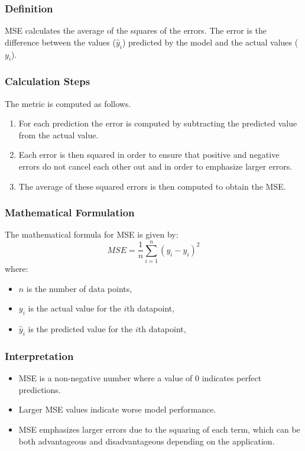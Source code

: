 \subsubsection{Definition}
MSE calculates the average of the squares of the errors. The error is the difference between the values (\(\hat{y}_i\)) predicted by the model and the actual values (\(y_i\)).

\subsubsection{Calculation Steps}
The metric is computed as follows.
\begin{enumerate}
	\item For each prediction the error is computed by subtracting the predicted value from the actual value.
	\item Each error is then squared in order to ensure that positive and negative errors do not cancel each other out and in order to emphasize larger errors.
	\item The average of these squared errors is then computed to obtain the MSE.
\end{enumerate}

\subsubsection{Mathematical Formulation}
The mathematical formula for MSE is given by:
\begin{equation}
	MSE = \frac{1}{n} \sum_{i=1}^{n} (y_i - \hat{y}_i)^2
\end{equation}
where:
\begin{itemize}
	\item \(n\) is the number of data points,
	\item \(y_i\) is the actual value for the \(i\)th datapoint,
	\item \(\hat{y}_i\) is the predicted value for the \(i\)th datapoint,
\end{itemize}

\subsubsection{Interpretation}
\begin{itemize}
	\item MSE is a non-negative number where a value of 0 indicates perfect predictions.
	\item Larger MSE values indicate worse model performance.
	\item MSE emphasizes larger errors due to the squaring of each term, which can be both advantageous and disadvantageous depending on the application.
\end{itemize}


